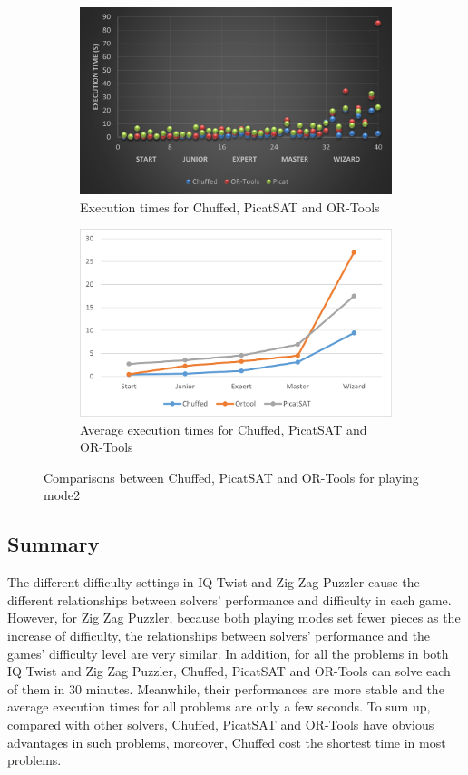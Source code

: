 \begin{figure}[H]
\begin{subfigure}[b]{0.48\textwidth}
  \centering
    \includegraphics[width=\textwidth]{figs/time2three.png}
    \caption{Execution times for Chuffed, PicatSAT and OR-Tools}
    \label{fig:compare}
\end{subfigure}
\begin{subfigure}[b]{0.48\textwidth}
 \centering
    \includegraphics[width=\textwidth]{figs/Threecomparison2.png}
    \caption{Average execution times for Chuffed, PicatSAT and OR-Tools}
    \label{fig:compare}
\end{subfigure}
\caption{Comparisons between Chuffed, PicatSAT and OR-Tools for playing mode2}
\label{fig:comparisonlast}
\end{figure}
\subsection{Summary}
\label{sec:Summary}
The different difficulty settings in IQ Twist and Zig Zag Puzzler cause the different relationships between solvers' performance and difficulty in each game. However, for Zig Zag Puzzler, because both playing modes set fewer pieces as the increase of difficulty, the relationships between solvers' performance and the games' difficulty level are very similar. In addition, for all the problems in both IQ Twist and Zig Zag Puzzler, Chuffed, PicatSAT and OR-Tools can solve each of them in 30 minutes. Meanwhile, their performances are more stable and the average execution times for all problems are only a few seconds. To sum up, compared with other solvers, Chuffed, PicatSAT and OR-Tools have obvious advantages in such problems, moreover, Chuffed cost the shortest time in most problems. 
 
